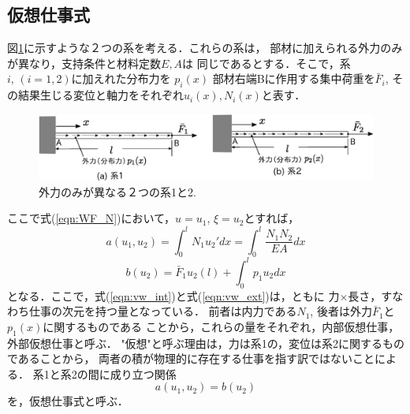 \documentclass[10pt,a4j]{jarticle}
\begin{document}
\subsection{仮想仕事式}
図\ref{fig:fig1_2}に示すような２つの系を考える．これらの系は，
部材に加えられる外力のみが異なり，支持条件と材料定数$E,A$は
同じであるとする．そこで，系$i,\, (i=1,2)$に加えれた分布力を
$p_i(x)$ 部材右端Bに作用する集中荷重を$\bar F_i$, 
その結果生じる変位と軸力をそれぞれ$u_i(x), N_i(x)$と表す．
\begin{figure}[h]
	\begin{center}
	\includegraphics[width=0.8\linewidth]{fig1_2.eps} 
	\end{center}
	\caption{外力のみが異なる２つの系1と2.} 
	\label{fig:fig1_2}
\end{figure}
ここで式(\ref{eqn:WF_N})において，$u=u_1$, $\xi=u_2$とすれば，
\begin{equation}
	a(u_1,u_2)=\int_0^l N_1u_2'dx = \int_0^l\frac{N_1N_2}{EA}dx
	\label{eqn:vw_int}
\end{equation}
\begin{equation}
	b(u_2)=\bar F_1 u_2(l)+\int_0^l p_1 u_2dx
	\label{eqn:vw_ext}
\end{equation}
となる．ここで，式(\ref{eqn:vw_int})と式(\ref{eqn:vw_ext})は，ともに
力$\times$長さ，すなわち仕事の次元を持つ量となっている．
前者は内力である$N_1$, 後者は外力$\bar F_1$と$p_1(x)$に関するものである
ことから，これらの量をそれぞれ，内部仮想仕事，外部仮想仕事と呼ぶ．
"仮想"と呼ぶ理由は，力は系1の，変位は系2に関するものであることから，
両者の積が物理的に存在する仕事を指す訳ではないことによる．
系1と系2の間に成り立つ関係
\begin{equation}
	a(u_1,u_2)=b(u_2)
	\label{eqn:vw_eq}
\end{equation}
を，仮想仕事式と呼ぶ．
\end{document}
